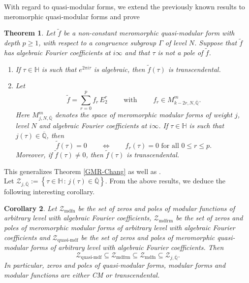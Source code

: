 \documentclass[11pt, reqno]{amsart}
\newtheorem{theorem}{Theorem}[section]
\newtheorem{corollary}[theorem]{Corollary}
\begin{document}
With regard to quasi-modular forms, we extend the previously known results to meromorphic quasi-modular forms and prove
\begin{theorem}\label{quasi-mdf-thm}
    Let $\widetilde{f}$ be a non-constant meromorphic quasi-modular form with depth $p \geq 1$, with respect to a congruence subgroup $\Gamma$ of level $N$. Suppose that $\widetilde{f}$ has algebraic Fourier coefficients at $i\infty$ and that $\tau$ is not a pole of $\widetilde{f}$. 
  \begin{enumerate}
      \item[(a)] If $\tau\in\mathbb{H}$ is such that $e^{2\pi i\tau}$ is algebraic, then $\widetilde{f}(\tau)$ is transcendental.
      \item[(b)] Let 
      \begin{equation*}
          \widetilde{f} = \sum_{r=0}^p f_{r} \, E_2^r \qquad \text{ with } \qquad f_{r} \in M^m_{k-2r, N, \overline{\mathbb{Q}}}.
      \end{equation*}
      Here $M^m_{j,N,\overline{\mathbb{Q}}}$ denotes the space of meromorphic modular forms of weight $j$, level $N$ and algebraic Fourier coefficients at $i\infty$. If $\tau\in\mathbb{H}$ is such that $j(\tau)\in \overline{\mathbb{Q}}$, then 
      \begin{equation*}
          \widetilde{f}(\tau) = 0 \qquad \iff \qquad f_r(\tau) = 0 \text{  for all  } 0 \leq r \leq p.
      \end{equation*}
      Moreover, if $\widetilde{f}(\tau) \neq 0$, then $\widetilde{f}(\tau)$ is transcendental.
  \end{enumerate}  
\end{theorem}
This generalizes Theorem \ref{GMR-Chang} as well as \cite[Theorem 1.8]{balu-gun}.  \\

Let $\mathcal{Z}_{j, \overline{\mathbb{Q}}}:= \left\{ \tau \in \mathbb{H} \,: \, j(\tau) \in \overline{\mathbb{Q}} \right\}$. From the above results, we deduce the following interesting corollary.
\begin{corollary}
Let $\mathcal{Z}_{\text{mdfn}}$ be the set of zeros and poles of modular \emph{functions} of arbitrary level with algebraic Fourier coefficients, $\mathcal{Z}_{\text{mdfrm}}$ be the set of zeros and poles of meromorphic modular forms of arbitrary level with algebraic Fourier coefficients and $\mathcal{Z}_{\text{quasi-mdf}}$ be the set of zeros and poles of meromorphic quasi-modular forms of arbitrary level with algebraic Fourier coefficients. Then
\begin{equation*}
    \mathcal{Z}_{\text{quasi-mdf}} \subseteq \mathcal{Z}_{\text{mdfrm}} \subseteq \mathcal{Z}_{\text{mdfn}} \subseteq \mathcal{Z}_{j, \overline{\mathbb{Q}}}.
\end{equation*}
In particular, zeros and poles of quasi-modular forms, modular forms and modular functions are either CM or transcendental.
\end{corollary}
\end{document}
